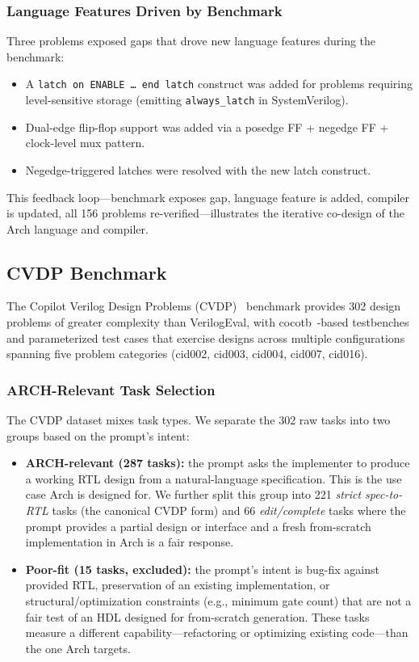 \documentclass[11pt,twocolumn]{article}
\begin{document}
\subsubsection{Language Features Driven by Benchmark}

Three problems exposed gaps that drove new language features during the benchmark:

\begin{itemize}
\item A \texttt{latch on ENABLE \ldots\ end latch} construct was added for problems requiring level-sensitive storage (emitting \texttt{always\_latch} in SystemVerilog).
\item Dual-edge flip-flop support was added via a posedge FF + negedge FF + clock-level mux pattern.
\item Negedge-triggered latches were resolved with the new latch construct.
\end{itemize}

This feedback loop---benchmark exposes gap, language feature is added, compiler is updated, all 156 problems re-verified---illustrates the iterative co-design of the Arch language and compiler.

\subsection{CVDP Benchmark}\label{sec:cvdp}

The Copilot Verilog Design Problems (CVDP)~\cite{cvdp} benchmark provides 302 design problems of greater complexity than VerilogEval, with cocotb~\cite{cocotb}-based testbenches and parameterized test cases that exercise designs across multiple configurations spanning five problem categories (cid002, cid003, cid004, cid007, cid016).

\subsubsection{ARCH-Relevant Task Selection}

The CVDP dataset mixes task types. We separate the 302 raw tasks into two groups based on the prompt's intent:

\begin{itemize}
\item \textbf{ARCH-relevant (287 tasks):} the prompt asks the implementer to produce a working RTL design from a natural-language specification. This is the use case Arch is designed for. We further split this group into 221 \emph{strict spec-to-RTL} tasks (the canonical CVDP form) and 66 \emph{edit/complete} tasks where the prompt provides a partial design or interface and a fresh from-scratch implementation in Arch is a fair response.
\item \textbf{Poor-fit (15 tasks, excluded):} the prompt's intent is bug-fix against provided RTL, preservation of an existing implementation, or structural/optimization constraints (e.g., minimum gate count) that are not a fair test of an HDL designed for from-scratch generation. These tasks measure a different capability---refactoring or optimizing existing code---than the one Arch targets.
\end{itemize}
\end{document}
